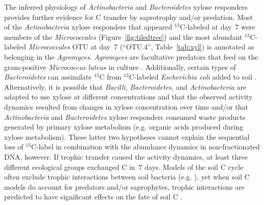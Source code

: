 The inferred physiology of \textit{Actinobacteria} and \textit{Bacteroidetes}
xylose responders provides further evidence for C transfer by
saprotrophy and/or predation. Most of the \textit{Actinobacteria} xylose
responders that appeared $^{13}$C-labeled at day~7 were members of the
\textit{Micrococcales} (Figure~\ref{fig:tiledtree}) and the most abundant
$^{13}$C-labeled \textit{Micrococcales} OTU at day~7 (“OTU.4”,
Table~\ref{tab:xyl}) is annotated as belonging in the \textit{Agromyces}.
\textit{Agromyces} are facultative predators that feed on the gram-positive
\textit{Micrococcus luteus} in culture \citep{16346402}. Additionally, certain types
of \textit{Bacteroidetes} can assimilate $^{13}$C from $^{13}$C-labeled
\textit{Escherichia coli} added to soil \citep{Lueders2006}.
Alternatively, it is possible that \textit{Bacilli},
\textit{Bacteroidetes}, and \textit{Actinobacteria} are adapted to use
xylose at different concentrations and that the observed activity dynamics
resulted from changes in xylose concentration over time and/or that
\textit{Actinobacteria} and \textit{Bacteroidetes} xylose responders
consumed waste products generated by primary xylose metabolism (e.g.
organic acids produced during xylose metabolism). These latter two
hypotheses cannot explain the sequential loss of $^{13}$C-label in combination
with the abundance dynamics in non-fractionated DNA, however.
If trophic transfer caused the activity dynamics, at least three different
ecological groups exchanged C in~7 days. Models of the soil C cycle often
exclude trophic interactions between soil bacteria (e.g.
\citep{Moore1988}), yet when soil C models do account for predators and/or
saprophytes, trophic interactions are predicted to have significant
effects on the fate of soil C \citep{Kaiser2014a}. 

